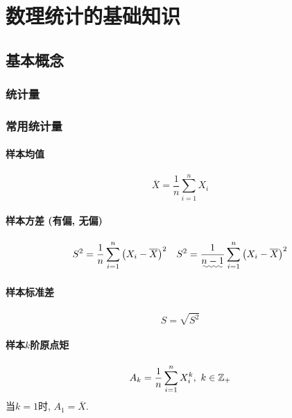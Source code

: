 \chapter{数理统计的基础知识}
\section{基本概念}
\subsection{统计量}
\subsection{常用统计量}
\subsubsection{样本均值}
\begin{equation}
    \overline{X} = \frac{1}{n}\sum_{i=1}^n X_i
\end{equation}
\subsubsection{样本方差 (有偏, 无偏)}
\begin{align}
    S^2 = \frac{1}{n}\sum_{i=1}^n \left( X_i - \overline{X} \right)^2 &  &
    S^2 = \frac{1}{\uwave{n-1}}\sum_{i=1}^n \left( X_i - \overline{X} \right)^2
\end{align}
\subsubsection{样本标准差}
\begin{equation}
    S = \sqrt{S^2}
\end{equation}
\subsubsection{样本$k$阶原点矩}
\begin{equation}
    A_k = \frac{1}{n}\sum_{i=1}^n X_i^k,\,\,k\in \ZZ_+
\end{equation}
当$k=1$时, $A_1 = \overline{X}$.
